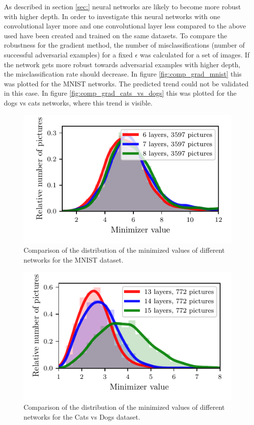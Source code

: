 \documentclass[%
 reprint,
 amsmath,amssymb,
 aps,
]{revtex4-1}
\begin{document}
As described in section \ref{sec:} neural networks are likely to become more robust with higher depth. In order to investigate this neural networks with one convolutional layer more and one convolutional layer less compared to the above used have been created and trained on the same datasets. To compare the robustness for the gradient method, the number of misclassifications (number of successful adversarial examples) for a fixed $\epsilon$ was calculated for a set of images. If the network gets more robust towards adversarial examples with higher depth, the misclassification rate should decrease. In figure \ref{fig:comp_grad_mnist} this was plotted for the MNIST networks. The predicted trend could not be validated in this case. In figure \ref{fig:comp_grad_cats_vs_dogs} this was plotted for the dogs vs cats networks, where this trend is visible. \\

\begin{figure}
\centering
\showthe\columnwidth
\includegraphics[width = 1\linewidth]{figures/plot_mnist_robustness_minimizer.pdf}
\caption{Comparison of the distribution of the minimized values of different networks for the MNIST dataset.}
\label{fig:comp_min_mnist}
\end{figure}

\begin{figure}
\centering
\showthe\columnwidth
\includegraphics[width = 1\linewidth]{figures/plot_cats_vs_dogs_robustness_minimizer.pdf}
\caption{Comparison of the distribution of the minimized values of different networks for the Cats vs Dogs dataset.}
\label{fig:comp_min_cats_vs_dogs}
\end{figure}
\end{document}
